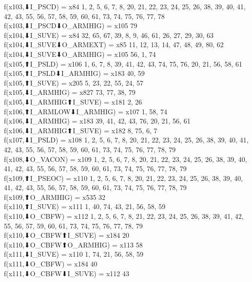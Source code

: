 f(x103,⬇I_PSCD) = x84 {1, 2, 5, 6, 7, 8, 20, 21, 22, 23, 24, 25, 26, 38, 39, 40, 41, 42, 43, 55, 56, 57, 58, 59, 60, 61, 73, 74, 75, 76, 77, 78} \\
f(x103,⬇I_PSCD⬇O_ARMHIG) = x105 {79} \\
f(x104,⬇I_SUVE) = x84 {32, 65, 67, 39, 8, 9, 46, 61, 26, 27, 29, 30, 63} \\
f(x104,⬇I_SUVE⬇O_ARMEXT) = x85 {11, 12, 13, 14, 47, 48, 49, 80, 62} \\
f(x104,⬇I_SUVE⬇O_ARMHIG) = x105 {56, 1, 74} \\
f(x105,⬆I_PSLD) = x106 {1, 6, 7, 8, 39, 41, 42, 43, 74, 75, 76, 20, 21, 56, 58, 61} \\
f(x105,⬆I_PSLD⬇I_ARMHIG) = x183 {40, 59} \\
f(x105,⬆I_SUVE) = x205 {5, 23, 22, 55, 24, 57} \\
f(x105,⬇I_ARMHIG) = x827 {73, 77, 38, 79} \\
f(x105,⬇I_ARMHIG⬆I_SUVE) = x181 {2, 26} \\
f(x106,⬆I_ARMLOW⬇I_ARMHIG) = x107 {1, 58, 74} \\
f(x106,⬇I_ARMHIG) = x183 {39, 41, 42, 43, 76, 20, 21, 56, 61} \\
f(x106,⬇I_ARMHIG⬆I_SUVE) = x182 {8, 75, 6, 7} \\
f(x107,⬇I_PSLD) = x108 {1, 2, 5, 6, 7, 8, 20, 21, 22, 23, 24, 25, 26, 38, 39, 40, 41, 42, 43, 55, 56, 57, 58, 59, 60, 61, 73, 74, 75, 76, 77, 78, 79} \\
f(x108,⬇O_VACON) = x109 {1, 2, 5, 6, 7, 8, 20, 21, 22, 23, 24, 25, 26, 38, 39, 40, 41, 42, 43, 55, 56, 57, 58, 59, 60, 61, 73, 74, 75, 76, 77, 78, 79} \\
f(x109,⬆I_PSEOC) = x110 {1, 2, 5, 6, 7, 8, 20, 21, 22, 23, 24, 25, 26, 38, 39, 40, 41, 42, 43, 55, 56, 57, 58, 59, 60, 61, 73, 74, 75, 76, 77, 78, 79} \\
f(x109,⬆O_ARMHIG) = x535 {32} \\
f(x110,⬆I_SUVE) = x111 {1, 40, 74, 43, 21, 56, 58, 59} \\
f(x110,⬇O_CBFW) = x112 {1, 2, 5, 6, 7, 8, 21, 22, 23, 24, 25, 26, 38, 39, 41, 42, 55, 56, 57, 59, 60, 61, 73, 74, 75, 76, 77, 78, 79} \\
f(x110,⬇O_CBFW⬆I_SUVE) = x184 {20} \\
f(x110,⬇O_CBFW⬆O_ARMHIG) = x113 {58} \\
f(x111,⬇I_SUVE) = x110 {1, 74, 21, 56, 58, 59} \\
f(x111,⬇O_CBFW) = x184 {40} \\
f(x111,⬇O_CBFW⬇I_SUVE) = x112 {43} \\
